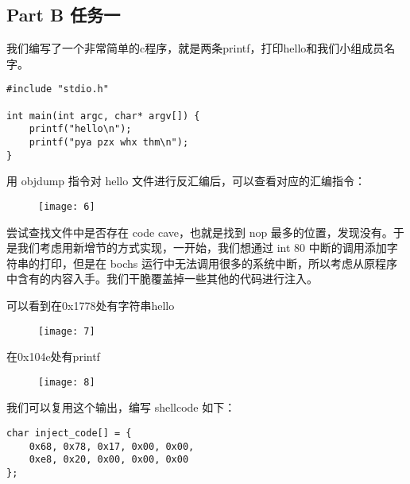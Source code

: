 \documentclass{whureport}
\begin{document}
\subsection{Part B 任务一}
我们编写了一个非常简单的c程序，就是两条printf，打印hello和我们小组成员名字。
\begin{lstlisting}
#include "stdio.h"

int main(int argc, char* argv[]) {
    printf("hello\n");
    printf("pya pzx whx thm\n");
}
\end{lstlisting}
用 objdump 指令对 hello 文件进行反汇编后，可以查看对应的汇编指令：

\begin{figure}[H]
\centering
\texttt{[image: 6]}
\end{figure}

尝试查找文件中是否存在 code cave，也就是找到 nop 最多的位置，发现没有。于是我们考虑用新增节的方式实现，一开始，我们想通过 int 80 中断的调用添加字符串的打印，但是在 bochs 运行中无法调用很多的系统中断，所以考虑从原程序中含有的内容入手。我们干脆覆盖掉一些其他的代码进行注入。

可以看到在0x1778处有字符串hello

\begin{figure}[H]
\centering
\texttt{[image: 7]}
\end{figure}

在0x104e处有printf

\begin{figure}[H]
\centering
\texttt{[image: 8]}
\end{figure}

我们可以复用这个输出，编写 shellcode 如下：
\begin{lstlisting}
char inject_code[] = {
	0х68, 0х78, 0x17, 0х00, 0х00,
 	0xe8, 0x20, 0х00, 0х00, 0х00
};
\end{lstlisting}
\end{document}
